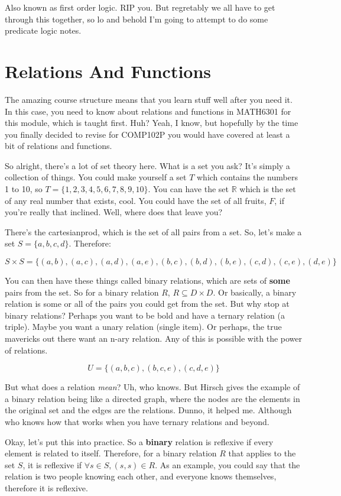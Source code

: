 Also known as first order logic. RIP you. But regretably we all have to get through this together, so lo and behold I'm going to attempt to do some predicate logic notes.

\section{Relations And Functions}
The amazing course structure means that you learn stuff well after you need it. In this case, you need to know about relations and functions in MATH6301 for this module, which is taught first. Huh? Yeah, I know, but hopefully by the time you finally decided to revise for COMP102P you would have covered at least a bit of relations and functions.

So alright, there's a lot of set theory here. What is a set you ask? It's simply a collection of things. You could make yourself a set $T$ which contains the numbers 1 to 10, so $T = \{1, 2, 3, 4, 5, 6, 7, 8, 9, 10\}$. You can have the set $\mathbb{R}$ which is the set of any real number that exists, cool. You could have the set of all fruits, $F$, if you're really that inclined. Well, where does that leave you?

There's the \gls{cartesianprod}, which is the set of all pairs from a set. So, let's make a set $S = \{a, b, c, d\}$. Therefore:

\[
    S \times S = \{(a,b), (a,c), (a,d), (a,e), (b,c), (b,d), (b,e), (c,d), (c,e), (d,e)\}
\]

You can then have these things called binary relations, which are sets of \textbf{some} pairs from the set. So for a binary relation $R$, $R \subseteq D \times D$. Or basically, a binary relation is some or all of the pairs you could get from the set. But why stop at binary relations? Perhaps you want to be bold and have a ternary relation (a triple). Maybe you want a unary relation (single item). Or perhaps, the true mavericks out there want an n-ary relation. Any of this is possible with the power of relations.

\[
    U = \{(a,b,c), (b,c,e), (c,d,e)\}
\]

But what does a relation \textit{mean}? Uh, who knows. But Hirsch gives the example of a binary relation being like a directed graph, where the nodes are the elements in the original set and the edges are the relations. Dunno, it helped me. Although who knows how that works when you have ternary relations and beyond.

Okay, let's put this into practice. So a \textbf{binary} relation is \gls{reflexive} if every element is related to itself. Therefore, for a binary relation $R$ that applies to the set $S$, it is reflexive if $\forall s \in S, (s,s) \in R$. As an example, you could say that the relation is two people knowing each other, and everyone knows themselves, therefore it is reflexive.

